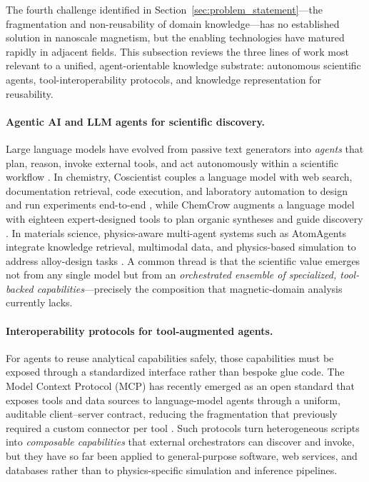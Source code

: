\documentclass[letterpaper, 12, one column]{article}
\begin{document}
The fourth challenge identified in Section~\ref{sec:problem_statement}---the fragmentation and non-reusability of domain knowledge---has no established solution in nanoscale magnetism, but the enabling technologies have matured rapidly in adjacent fields. This subsection reviews the three lines of work most relevant to a unified, agent-orientable knowledge substrate: autonomous scientific agents, tool-interoperability protocols, and knowledge representation for reusability.

\paragraph{Agentic AI and LLM agents for scientific discovery.}
Large language models have evolved from passive text generators into \emph{agents} that plan, reason, invoke external tools, and act autonomously within a scientific workflow \cite{gridach2025agentic}. In chemistry, Coscientist couples a language model with web search, documentation retrieval, code execution, and laboratory automation to design and run experiments end-to-end \cite{boiko2023autonomous}, while ChemCrow augments a language model with eighteen expert-designed tools to plan organic syntheses and guide discovery \cite{bran2024augmenting}. In materials science, physics-aware multi-agent systems such as AtomAgents integrate knowledge retrieval, multimodal data, and physics-based simulation to address alloy-design tasks \cite{ghafarollahi2024atomagents}. A common thread is that the scientific value emerges not from any single model but from an \emph{orchestrated ensemble of specialized, tool-backed capabilities}---precisely the composition that magnetic-domain analysis currently lacks.

\paragraph{Interoperability protocols for tool-augmented agents.}
For agents to reuse analytical capabilities safely, those capabilities must be exposed through a standardized interface rather than bespoke glue code. The Model Context Protocol (MCP) has recently emerged as an open standard that exposes tools and data sources to language-model agents through a uniform, auditable client--server contract, reducing the fragmentation that previously required a custom connector per tool \cite{hou2025mcp}. Such protocols turn heterogeneous scripts into \emph{composable capabilities} that external orchestrators can discover and invoke, but they have so far been applied to general-purpose software, web services, and databases rather than to physics-specific simulation and inference pipelines.
\end{document}

